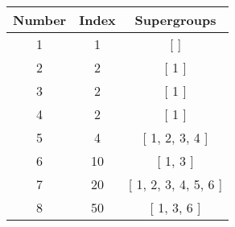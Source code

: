 \begin{center}
\begin{tabular}{|| c c c ||}
\hline
Number &  Index &  Supergroups
\\\hline
1 & 1 & [  ]
\\\hline
2 & 2 & [ 1 ]
\\\hline
3 & 2 & [ 1 ]
\\\hline
4 & 2 & [ 1 ]
\\\hline
5 & 4 & [ 1, 2, 3, 4 ]
\\\hline
6 & 10 & [ 1, 3 ]
\\\hline
7 & 20 & [ 1, 2, 3, 4, 5, 6 ]
\\\hline
8 & 50 & [ 1, 3, 6 ]
\\\hline
\end{tabular}
\end{center}
